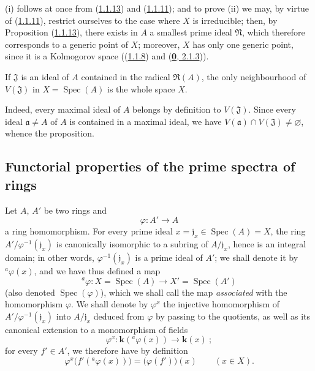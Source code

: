 (i) follows at once from (\hyperref[I.1.1.13]{1.1.13}) and
(\hyperref[I.1.1.11]{1.1.11}); and to prove (ii) we may, by virtue of
(\hyperref[I.1.1.11]{1.1.11}), restrict ourselves to the case where $X$ is
irreducible; then, by Proposition (\hyperref[I.1.1.13]{1.1.13}), there
exists in $A$ a smallest prime ideal $\mathfrak{N}$, which therefore
corresponds to a generic point
of $X$; moreover, $X$ has only one generic point, since it is a
Kolmogorov space ((\hyperref[I.1.1.8]{1.1.8}) and
(\hyperref[0.2.1.3]{\textbf{0}, 2.1.3})).

\begin{proposition}[1.1.15]
\label{I.1.1.15}
If $\mathfrak{J}$ is an ideal of $A$ contained in the radical
$\mathfrak{R}(A)$, the only neighbourhood of $V(\mathfrak{J})$ in
$X=\operatorname{Spec}(A)$ is the whole space $X$.
\end{proposition}

Indeed, every maximal ideal of $A$ belongs by definition to
$V(\mathfrak{J})$. Since every ideal $\mathfrak{a}\neq A$ of $A$ is contained
in a maximal ideal, we have $V(\mathfrak{a})\cap V(\mathfrak{J})\neq\varnothing$,
whence the proposition.

\subsection{Functorial properties of the prime spectra of rings}
\label{subsection:I.1.2}

\begin{env}[1.2.1]
\label{I.1.2.1}
Let $A$, $A'$ be two rings and
\[
  \varphi:A'\longrightarrow A
\]
a ring homomorphism. For every prime ideal
$x=\mathfrak{j}_x\in\operatorname{Spec}(A)=X$, the ring
$A'/\varphi^{-1}(\mathfrak{j}_x)$ is canonically isomorphic to a
subring of $A/\mathfrak{j}_x$, hence is an integral domain; in other words,
$\varphi^{-1}(\mathfrak{j}_x)$ is a prime ideal of $A'$; we shall
denote it by ${}^a\varphi(x)$, and we have thus defined a map
\[
  {}^a\varphi:X=\operatorname{Spec}(A)\longrightarrow
  X'=\operatorname{Spec}(A')
\]
(also denoted $\operatorname{Spec}(\varphi)$), which we shall call the map
\emph{associated} with the homomorphism $\varphi$. We shall denote by
$\varphi^x$ the injective homomorphism of
$A'/\varphi^{-1}(\mathfrak{j}_x)$ into $A/\mathfrak{j}_x$ deduced from
$\varphi$ by passing to the quotients, as well as its canonical extension to
a monomorphism of fields
\[
  \varphi^x:\boldsymbol{k}({}^a\varphi(x))\longrightarrow\boldsymbol{k}(x)~;
\]
for every $f'\in A'$, we therefore have by definition
\begin{equation}
  \varphi^x\bigl(f'({}^a\varphi(x))\bigr)=\bigl(\varphi(f')\bigr)(x)
  \qquad(x\in X).
  \tag{1.2.1.1}\label{I.1.2.1.1}
\end{equation}
\end{env}

